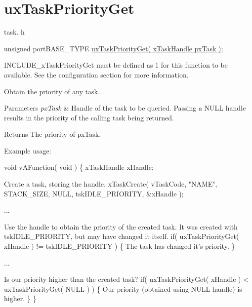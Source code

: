 \hypertarget{group__ux_task_priority_get}{\section{ux\-Task\-Priority\-Get}
\label{group__ux_task_priority_get}
}
task. h 
\begin{DoxyPre}unsigned portBASE\_TYPE \hyperlink{task_8h_a77e34af34b3eb5b0cb8be413eee6b180}{uxTaskPriorityGet( xTaskHandle pxTask )};\end{DoxyPre}


I\-N\-C\-L\-U\-D\-E\-\_\-x\-Task\-Priority\-Get must be defined as 1 for this function to be available. See the configuration section for more information.

Obtain the priority of any task.


\begin{DoxyParams}{Parameters}
{\em px\-Task} & Handle of the task to be queried. Passing a N\-U\-L\-L handle results in the priority of the calling task being returned.\\
\hline
\end{DoxyParams}
\begin{DoxyReturn}{Returns}
The priority of px\-Task.
\end{DoxyReturn}
Example usage\-: 
\begin{DoxyPre}
 void vAFunction( void )
 \{
 xTaskHandle xHandle;\end{DoxyPre}



\begin{DoxyPre}Create a task, storing the handle.
     xTaskCreate( vTaskCode, "NAME", STACK\_SIZE, NULL, tskIDLE\_PRIORITY, \&xHandle );\end{DoxyPre}



\begin{DoxyPre}...\end{DoxyPre}



\begin{DoxyPre}Use the handle to obtain the priority of the created task.
It was created with tskIDLE\_PRIORITY, but may have changed
it itself.
     if( uxTaskPriorityGet( xHandle ) != tskIDLE\_PRIORITY )
     \{
The task has changed it's priority.
     \}\end{DoxyPre}



\begin{DoxyPre}...\end{DoxyPre}



\begin{DoxyPre}Is our priority higher than the created task?
     if( uxTaskPriorityGet( xHandle ) < uxTaskPriorityGet( NULL ) )
     \{
Our priority (obtained using NULL handle) is higher.
     \}
 \}
   \end{DoxyPre}
 
